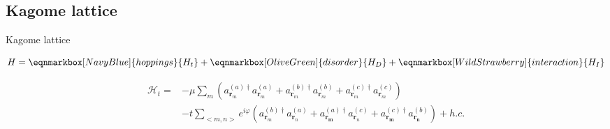 \subsection{Kagome lattice}
\begin{frame}{Kagome lattice}

\begin{equation*}
    H = \eqnmarkbox[NavyBlue]{hoppings}{H_{t}}
    + \eqnmarkbox[OliveGreen]{disorder}{H_{D}}
    + \eqnmarkbox[WildStrawberry]{interaction}{H_{I}}
\end{equation*}

\vspace{-4mm}
\begin{block}{}%
\begin{equation*}
\begin{aligned}
\mathcal{H}_{t}=&-\mu\sum_{m}(a_{\mathbf{r}_{m}}^{(a)\dagger}a_{\mathbf{r}_{m}}^{(a)}+a_{\mathbf{r}_{m}}^{(b)\dagger}a_{\mathbf{r}_{m}}^{(b)}+a_{\mathbf{r}_{m}}^{(c)\dagger}a_{\mathbf{r}_{m}}^{(c)})\\
&-t\sum_{<m,n>}e^{i\varphi}(a_{\mathbf{r}_m}^{(b)\dagger}a_{\mathbf{r}_n}^{(a)}+a_{\mathbf{{r}_m}}^{(a)\dagger}a_{\mathbf{r}_n}^{(c)}+a_{\mathbf{{r}_m}}^{(c)\dagger}a_{\mathbf{{r}_n}}^{(b)})+h.c.
\end{aligned}
\end{equation*}
\end{block}
\vspace{-1mm}


\end{frame}

